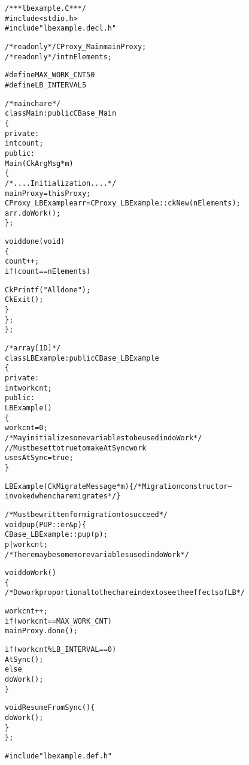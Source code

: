 \begin{alltt}
/*** lbexample.C ***/
#include <stdio.h>
#include "lbexample.decl.h"

/*readonly*/ CProxy_Main mainProxy;
/*readonly*/ int nElements;

#define MAX_WORK_CNT 50
#define LB_INTERVAL 5

/*mainchare*/
class Main : public CBase_Main
\{
private:
  int count;
public:
  Main(CkArgMsg* m)
  \{
    /*....Initialization....*/
    mainProxy = thisProxy;
    CProxy_LBExample arr = CProxy_LBExample::ckNew(nElements);
    arr.doWork();
  \};

  void done(void)
  \{
    count++;
    if(count==nElements){
      CkPrintf("All done");
      CkExit();
    \}
  \};
\};

/*array [1D]*/
class LBExample : public CBase_LBExample
\{
private:
  int workcnt;
public:
  LBExample()
  \{
    workcnt=0;
    /* May initialize some variables to be used in doWork */
    //Must be set to true to make AtSync work
    usesAtSync = true;
  \}

  LBExample(CkMigrateMessage *m) \{ /* Migration constructor -- invoked when chare migrates */ \}
  
  /* Must be written for migration to succeed */
  void pup(PUP::er &p)\{
    CBase_LBExample::pup(p);
    p|workcnt;
    /* There may be some more variables used in doWork */
  }
	
  void doWork()
  \{
    /* Do work proportional to the chare index to see the effects of LB */
    
    workcnt++;
    if(workcnt==MAX_WORK_CNT)
      mainProxy.done();
    
    if(workcnt\%LB_INTERVAL==0)
      AtSync();
    else
      doWork();
  \}
  
  void ResumeFromSync()\{
    doWork();
  \}
\};

#include "lbexample.def.h"
\end{alltt}
